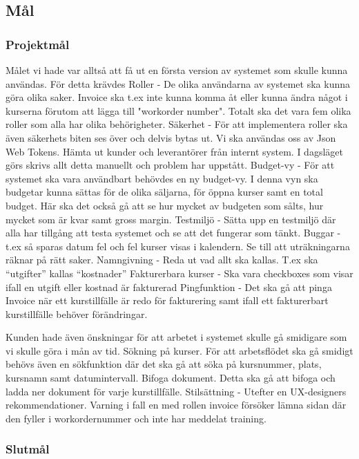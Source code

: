 \documentclass{article}
\begin{document}
    \subsection{Mål}
        \subsubsection{Projektmål}
        Målet vi hade var alltså att få ut en första version av systemet som skulle kunna användas.
För detta krävdes
Roller - De olika användarna av systemet ska kunna göra olika saker. Invoice ska t.ex inte kunna komma åt eller kunna ändra något i kurserna förutom att lägga till "workorder number". Totalt ska det vara fem olika roller som alla har olika behörigheter.
Säkerhet - För att implementera roller ska även säkerhets biten ses över och delvis bytas ut. Vi ska användas oss av Json Web Tokens.
Hämta ut kunder och leverantörer från internt system. I dagsläget görs skrivs allt detta manuellt och problem har uppstått. 
Budget-vy - För att systemet ska vara användbart behövdes en ny budget-vy. I denna vyn ska budgetar kunna sättas för de olika säljarna, för öppna kurser samt en total budget.
Här ska det också gå att se hur mycket av budgeten som sålts, hur mycket som är kvar samt gross margin.
Testmiljö - Sätta upp en testmiljö där alla har tillgång att testa systemet och se att det fungerar som tänkt.
Buggar - t.ex så sparas datum fel och fel kurser visas i kalendern. Se till att uträkningarna räknar på rätt saker. 
Namngivning - Reda ut vad allt ska kallas. T.ex ska “utgifter” kallas “kostnader”
Fakturerbara kurser - Ska vara checkboxes som visar ifall en utgift eller kostnad är fakturerad
Pingfunktion - Det ska gå att pinga Invoice när ett kurstillfälle är redo för fakturering samt ifall ett fakturerbart kurstillfälle behöver förändringar.

Kunden hade även önskningar för att arbetet i systemet skulle gå smidigare som vi skulle göra i mån av tid.
Sökning på kurser. För att arbetsflödet ska gå smidigt behövs även en sökfunktion där det ska gå att söka på kursnummer, plats, kursnamn samt datumintervall.
Bifoga dokument. Detta ska gå att bifoga och ladda ner dokument för varje kurstillfälle.
Stilsättning - Utefter en UX-designers rekommendationer. 
Varning i fall en med rollen invoice försöker lämna sidan där den fyller i workordernummer och inte har meddelat training.

        \subsubsection{Slutmål}
\end{document}
